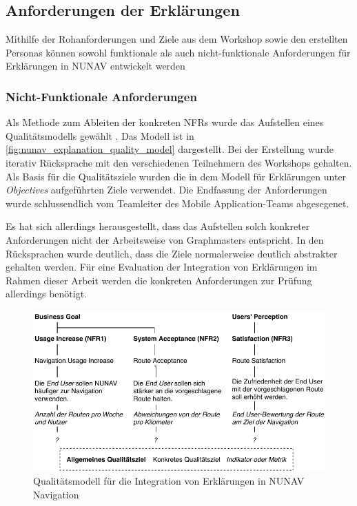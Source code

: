 \subsection{Anforderungen der Erklärungen}
\label{sec:explanation_requirements}

Mithilfe der Rohanforderungen und Ziele aus dem Workshop sowie den erstellten Personas können sowohl funktionale als auch nicht-funktionale Anforderungen für Erklärungen in NUNAV entwickelt werden

\subsubsection{Nicht-Funktionale Anforderungen}


Als Methode zum Ableiten der konkreten NFRs wurde das Aufstellen eines Qualitätsmodells gewählt \cite{schneider2012abenteuer}. Das Modell ist in \autoref{fig:nunav_explanation_quality_model} dargestellt. Bei der Erstellung wurde iterativ Rücksprache mit den verschiedenen Teilnehmern des Workshops gehalten. Als Basis für die Qualitätsziele wurden die in dem Modell für Erklärungen unter \textit{Objectives} aufgeführten Ziele verwendet. Die Endfassung der Anforderungen wurde schlussendlich vom Teamleiter des \glqq Mobile Application\grqq{}-Teams abgesegenet.

Es hat sich allerdings herausgestellt, dass das Aufstellen solch konkreter Anforderungen nicht der Arbeitsweise von Graphmasters entspricht. In den Rücksprachen wurde deutlich, dass die Ziele normalerweise deutlich abstrakter gehalten werden. Für eine Evaluation der Integration von Erklärungen im Rahmen dieser Arbeit werden die konkreten Anforderungen zur Prüfung allerdings benötigt.

\begin{figure}[htb!]
    \centering
    \includegraphics[width=\textwidth]{contents/06_model_evaluation/01_integration/res/quality_model.pdf}
    \caption{Qualitätsmodell für die Integration von Erklärungen in NUNAV Navigation}
    \label{fig:nunav_explanation_quality_model}
\end{figure}

